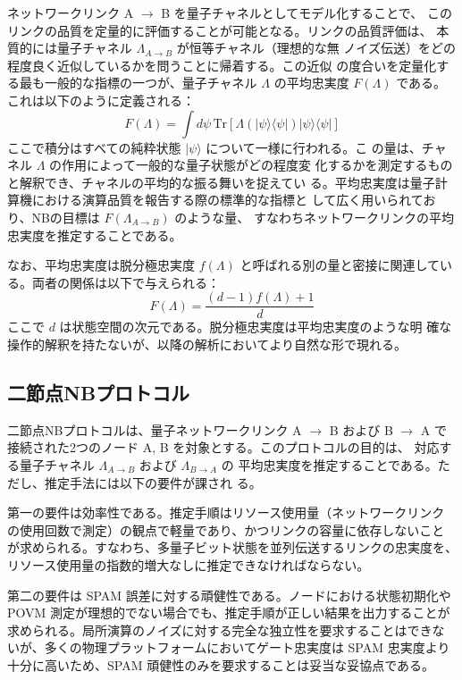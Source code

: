 \documentclass[12pt,a4paper,titlepage,dvipdfmx]{article}
\begin{document}
ネットワークリンク A $\to$ B を量子チャネルとしてモデル化することで、
このリンクの品質を定量的に評価することが可能となる。リンクの品質評価は、
本質的には量子チャネル $\Lambda_{A \to B}$ が恒等チャネル（理想的な無
ノイズ伝送）をどの程度良く近似しているかを問うことに帰着する。この近似
の度合いを定量化する最も一般的な指標の一つが、量子チャネル $\Lambda$
の平均忠実度 $F(\Lambda)$ である。これは以下のように定義される：
\begin{equation}
F(\Lambda) = \int d\psi \, \mathrm{Tr}[\Lambda(|\psi\rangle\langle\psi|)|\psi\rangle\langle\psi|]
\end{equation}
ここで積分はすべての純粋状態 $|\psi\rangle$ について一様に行われる。こ
の量は、チャネル $\Lambda$ の作用によって一般的な量子状態がどの程度変
化するかを測定するものと解釈でき、チャネルの平均的な振る舞いを捉えてい
る。平均忠実度は量子計算機における演算品質を報告する際の標準的な指標と
して広く用いられており、NBの目標は $F(\Lambda_{A \to B})$ のような量、
すなわちネットワークリンクの平均忠実度を推定することである。

なお、平均忠実度は脱分極忠実度 $f(\Lambda)$ と呼ばれる別の量と密接に関連している。両者の関係は以下で与えられる：
\begin{equation}
F(\Lambda) = \frac{(d-1)f(\Lambda) + 1}{d}
\end{equation}
ここで $d$ は状態空間の次元である。脱分極忠実度は平均忠実度のような明
確な操作的解釈を持たないが、以降の解析においてより自然な形で現れる。


\subsection{二節点NBプロトコル}

二節点NBプロトコルは、量子ネットワークリンク A $\to$ B および B $\to$
A で接続された2つのノード A, B を対象とする。このプロトコルの目的は、
対応する量子チャネル $\Lambda_{A \to B}$ および $\Lambda_{B \to A}$ の
平均忠実度を推定することである。ただし、推定手法には以下の要件が課され
る。

第一の要件は効率性である。推定手順はリソース使用量（ネットワークリンク
の使用回数で測定）の観点で軽量であり、かつリンクの容量に依存しないこと
が求められる。すなわち、多量子ビット状態を並列伝送するリンクの忠実度を、
リソース使用量の指数的増大なしに推定できなければならない。

第二の要件は SPAM 誤差に対する頑健性である。ノードにおける状態初期化や
POVM 測定が理想的でない場合でも、推定手順が正しい結果を出力することが
求められる。局所演算のノイズに対する完全な独立性を要求することはできな
いが、多くの物理プラットフォームにおいてゲート忠実度は SPAM 忠実度より
十分に高いため、SPAM 頑健性のみを要求することは妥当な妥協点である。
\end{document}
